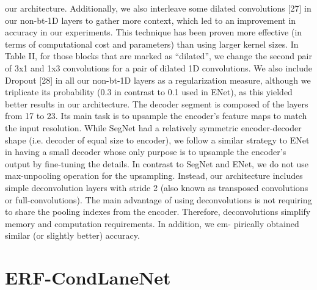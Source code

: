 our architecture. Additionally, we also interleave some dilated
convolutions [27] in our non-bt-1D layers to gather more
context, which led to an improvement in accuracy in our
experiments. This technique has been proven more effective
(in terms of computational cost and parameters) than using
larger kernel sizes. In Table II, for those blocks that are
marked as “dilated”, we change the second pair of 3x1 and
1x3 convolutions for a pair of dilated 1D convolutions. We
also include Dropout [28] in all our non-bt-1D layers as a
regularization measure, although we triplicate its probability
(0.3 in contrast to 0.1 used in ENet), as this yielded better
results in our architecture.
The decoder segment is composed of the layers from 17
to 23. Its main task is to upsample the encoder’s feature
maps to match the input resolution. While SegNet had a
relatively symmetric encoder-decoder shape (i.e. decoder of
equal size to encoder), we follow a similar strategy to ENet
in having a small decoder whose only purpose is to upsample
the encoder’s output by fine-tuning the details. In contrast to
SegNet and ENet, we do not use max-unpooling operation
for the upsampling. Instead, our architecture includes simple
deconvolution layers with stride 2 (also known as transposed
convolutions or full-convolutions). The main advantage of
using deconvolutions is not requiring to share the pooling
indexes from the encoder. Therefore, deconvolutions simplify
memory and computation requirements. In addition, we em-
pirically obtained similar (or slightly better) accuracy.
\section{ERF-CondLaneNet}